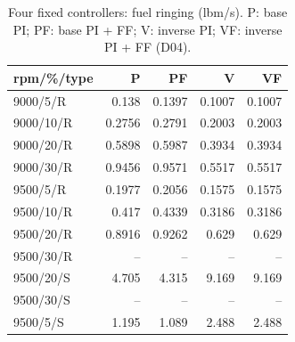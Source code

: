 \begin{table}[htbp]\centering\small\setlength{\tabcolsep}{4pt}\begin{tabular}{@{}lrrrr@{}}\toprule
rpm/\%/type & P & PF & V & VF\\\midrule
9000/5/R & 0.138 & 0.1397 & 0.1007 & 0.1007\\
9000/10/R & 0.2756 & 0.2791 & 0.2003 & 0.2003\\
9000/20/R & 0.5898 & 0.5987 & 0.3934 & 0.3934\\
9000/30/R & 0.9456 & 0.9571 & 0.5517 & 0.5517\\
9500/5/R & 0.1977 & 0.2056 & 0.1575 & 0.1575\\
9500/10/R & 0.417 & 0.4339 & 0.3186 & 0.3186\\
9500/20/R & 0.8916 & 0.9262 & 0.629 & 0.629\\
9500/30/R & -- & -- & -- & --\\
9500/20/S & 4.705 & 4.315 & 9.169 & 9.169\\
9500/30/S & -- & -- & -- & --\\
9500/5/S & 1.195 & 1.089 & 2.488 & 2.488\\
\bottomrule\end{tabular}\caption{Four fixed controllers: fuel ringing (lbm/s). P: base PI; PF: base PI + FF; V: inverse PI; VF: inverse PI + FF (D04).}\label{tab:fixed_ring}\end{table}